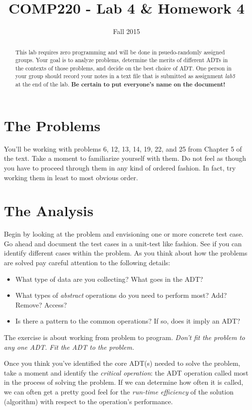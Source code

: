 \documentclass[10pt]{article}
\title{COMP220 - Lab 4 \& Homework 4}
\author{ }
\date{Fall 2015}
\begin{document}
\maketitle

\begin{abstract}
This lab requires zero programming and will be done in psuedo-randomly assigned groups. Your goal is to analyze problems, determine the merits of different ADTs in the contexts of those problems, and decide on the best choice of ADT. One person in your group should record your notes in a text file that is submitted as assignment \textit{lab5} at the end of the lab. \textbf{Be certain to put everyone's name on the document!}
\end{abstract}


\section{The Problems}

You'll be working with problems 6, 12, 13, 14, 19, 22, and 25 from Chapter 5 of the text. Take a moment to familiarize yourself with them. Do not feel as though you have to proceed through them in any kind of ordered fashion. In fact, try working them in least to most obvious order. 

\section{The Analysis}

Begin by looking at the problem and envisioning one or more concrete test case. Go ahead and document the test cases in a unit-test like fashion. See if you can identify different cases within the problem. As you think about how the problems are solved pay careful attention to the following details:
\begin{itemize}
\item What type of data are you collecting? What goes in the ADT? 
\item What types of \textit{abstract} operations do you need to perform most? Add? Remove? Access? 
\item Is there a pattern to the common operations? If so, does it imply an ADT? 
\end{itemize}
The exercise is about working from problem to program. \textit{Don't fit the problem to any one ADT. Fit the ADT to the problem.}

Once you think you've identified the core ADT(s) needed to solve the problem, take a moment and identify the \textit{critical operation}: the ADT operation called most in the process of solving the problem. If we can determine how often it is called, we can often get a pretty good feel for the \textit{run-time efficiency} of the solution (algorithm) with respect to the operation's performance. 
\end{document}
